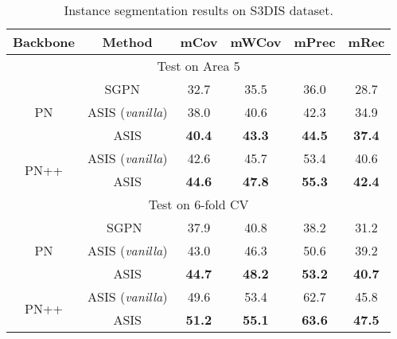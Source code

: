 \documentclass[10pt,twocolumn,letterpaper]{article}
\begin{document}
\begin{table}[!ht]
\begin{center}
\small 
\setlength{\tabcolsep}{3.8pt}
\begin{tabular}{c|c|c|c|c|c}
\hline 
\hline
 Backbone & Method    & mCov    & mWCov    &  mPrec & mRec \\
\hline
\hline
\multicolumn{6}{c}{Test on Area 5} \\
\hline
\multirow{3}{*}{PN} 
  & SGPN ~\cite{sgpn} &  32.7  & 35.5  &  36.0  & 28.7   \\
  & ASIS (\textit{vanilla}) & 38.0 & 40.6 & 42.3 & 34.9 \\
  & ASIS & {\bf 40.4}  & {\bf43.3} & {\bf 44.5} & {\bf 37.4} \\
 \hline
  \multirow{2}{*}{PN++}  
  & ASIS (\textit{vanilla}) & 42.6 & 45.7 & 53.4 & 40.6 \\
  & ASIS & {\bf 44.6}  & {\bf 47.8} & {\bf 55.3} & {\bf 42.4} \\
  
\hline 
\hline
\multicolumn{6}{c}{Test on 6-fold CV} \\
\hline
 \multirow{3}{*}{PN} 
 & SGPN~\cite{sgpn} & 37.9   & 40.8  & 38.2   & 31.2   \\
 & ASIS (\textit{vanilla}) & 43.0 & 46.3 & 50.6 & 39.2 \\
 &  ASIS & {\bf 44.7}  & {\bf 48.2} & {\bf 53.2} & {\bf 40.7} \\
 \hline
  \multirow{2}{*}{PN++}  
  & ASIS (\textit{vanilla}) & 49.6 & 53.4 & 62.7 & 45.8 \\
 & ASIS & {\bf 51.2}  & {\bf 55.1} & {\bf 63.6} & {\bf 47.5} \\
\hline
\end{tabular}
\end{center}
\caption{Instance segmentation results on S3DIS dataset.}
\label{tab:s3dis_ins_results}
\end{table}
\end{document}
